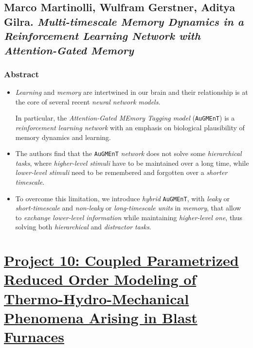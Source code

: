 \documentclass{book}
\numberwithin{equation}{section}
\begin{document}
\section{Marco Martinolli, Wulfram Gerstner, Aditya Gilra. \textit{Multi-timescale Memory Dynamics in a Reinforcement Learning Network with Attention-Gated Memory}}

\subsection*{Abstract}
\begin{itemize}
    \item \textit{Learning} and \textit{memory} are intertwined in our brain and their relationship is at the core of several recent \textit{neural network models}.
    
    In particular, the \textit{Attention-Gated MEmory Tagging model} (\texttt{AuGMEnT}) is a \textit{reinforcement learning network} with an emphasis on biological plausibility of memory dynamics and learning.
    \item The authors find that the \texttt{AuGMEnT} \textit{network} does not solve some \textit{hierarchical tasks}, where \textit{higher-level stimuli} have to be maintained over a long time, while \textit{lower-level stimuli} need to be remembered and forgotten over a \textit{shorter timescale}.
    \item To overcome this limitation, we introduce \textit{hybrid} \texttt{AuGMEnT}, with \textit{leaky} or \textit{short-timescale} and \textit{non-leaky} or \textit{long-timescale units} in \textit{memory}, that allow to \textit{exchange lower-level information} while maintaining \textit{higher-level one}, thus solving both \textit{hierarchical} and \textit{distractor tasks}.
\end{itemize}


\chapter{\href{https://www.romsoc.eu/coupled-parameterized-reduced-order-modelling-of-thermo-hydro-mechanical-phenomena-arising-in-blast-furnaces/}{Project 10: Coupled Parametrized Reduced Order Modeling of Thermo-Hydro-Mechanical Phenomena Arising in Blast Furnaces}}
\end{document}
